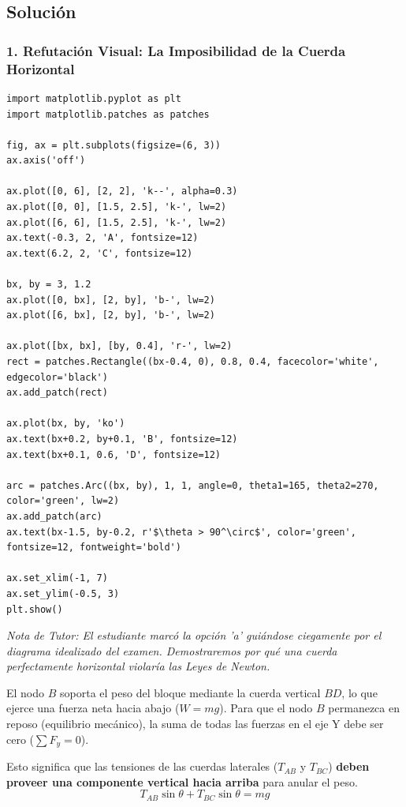 \documentclass[12pt, a4paper]{article}
\begin{document}
\subsection*{Solución}

\subsubsection*{1. Refutación Visual: La Imposibilidad de la Cuerda Horizontal}

\begin{verbatim}
import matplotlib.pyplot as plt
import matplotlib.patches as patches

fig, ax = plt.subplots(figsize=(6, 3))
ax.axis('off')

ax.plot([0, 6], [2, 2], 'k--', alpha=0.3)
ax.plot([0, 0], [1.5, 2.5], 'k-', lw=2)
ax.plot([6, 6], [1.5, 2.5], 'k-', lw=2)
ax.text(-0.3, 2, 'A', fontsize=12)
ax.text(6.2, 2, 'C', fontsize=12)

bx, by = 3, 1.2
ax.plot([0, bx], [2, by], 'b-', lw=2)
ax.plot([6, bx], [2, by], 'b-', lw=2)

ax.plot([bx, bx], [by, 0.4], 'r-', lw=2)
rect = patches.Rectangle((bx-0.4, 0), 0.8, 0.4, facecolor='white', edgecolor='black')
ax.add_patch(rect)

ax.plot(bx, by, 'ko')
ax.text(bx+0.2, by+0.1, 'B', fontsize=12)
ax.text(bx+0.1, 0.6, 'D', fontsize=12)

arc = patches.Arc((bx, by), 1, 1, angle=0, theta1=165, theta2=270, color='green', lw=2)
ax.add_patch(arc)
ax.text(bx-1.5, by-0.2, r'$\theta > 90^\circ$', color='green', fontsize=12, fontweight='bold')

ax.set_xlim(-1, 7)
ax.set_ylim(-0.5, 3)
plt.show()
\end{verbatim}

\textit{Nota de Tutor: El estudiante marcó la opción 'a' guiándose ciegamente por el diagrama idealizado del examen. Demostraremos por qué una cuerda perfectamente horizontal violaría las Leyes de Newton.}

El nodo $B$ soporta el peso del bloque mediante la cuerda vertical $BD$, lo que ejerce una fuerza neta hacia abajo ($W = mg$). 
Para que el nodo $B$ permanezca en reposo (equilibrio mecánico), la suma de todas las fuerzas en el eje Y debe ser cero ($\sum F_y = 0$).

Esto significa que las tensiones de las cuerdas laterales ($T_{AB}$ y $T_{BC}$) \textbf{deben proveer una componente vertical hacia arriba} para anular el peso. 
$$ T_{AB} \sin\theta + T_{BC} \sin\theta = mg $$
\end{document}
